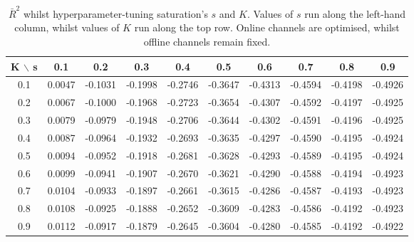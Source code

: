 \documentclass[11pt, a4paper]{article}
\begin{document}
 \begin{table}[h!]
    \centering
    \begin{tabular}{c|ccccccccc}
        \toprule
        \textbf{K $\backslash$ s} & \textbf{0.1} & \textbf{0.2} & \textbf{0.3} & \textbf{0.4} & \textbf{0.5} & \textbf{0.6} & \textbf{0.7} & \textbf{0.8} & \textbf{0.9} \\
        \midrule
        0.1 & 0.0047 & -0.1031 & -0.1998 & -0.2746 & -0.3647 & -0.4313 & -0.4594 & -0.4198 & -0.4926 \\
        0.2 & 0.0067 & -0.1000 & -0.1968 & -0.2723 & -0.3654 & -0.4307 & -0.4592 & -0.4197 & -0.4925 \\
        0.3 & 0.0079 & -0.0979 & -0.1948 & -0.2706 & -0.3644 & -0.4302 & -0.4591 & -0.4196 & -0.4925 \\
        0.4 & 0.0087 & -0.0964 & -0.1932 & -0.2693 & -0.3635 & -0.4297 & -0.4590 & -0.4195 & -0.4924 \\
        0.5 & 0.0094 & -0.0952 & -0.1918 & -0.2681 & -0.3628 & -0.4293 & -0.4589 & -0.4195 & -0.4924 \\
        0.6 & 0.0099 & -0.0941 & -0.1907 & -0.2670 & -0.3621 & -0.4290 & -0.4588 & -0.4194 & -0.4923 \\
        0.7 & 0.0104 & -0.0933 & -0.1897 & -0.2661 & -0.3615 & -0.4286 & -0.4587 & -0.4193 & -0.4923 \\
        0.8 & 0.0108 & -0.0925 & -0.1888 & -0.2652 & -0.3609 & -0.4283 & -0.4586 & -0.4192 & -0.4923 \\
        0.9 & 0.0112 & -0.0917 & -0.1879 & -0.2645 & -0.3604 & -0.4280 & -0.4585 & -0.4192 & -0.4922 \\
        \bottomrule
    \end{tabular}

    \caption{$\bar{R}^2$
 whilst hyperparameter-tuning saturation's $s$ and $K$. Values of $s$ run along the left-hand column, whilst values of $K$ run along the top row. Online channels are optimised, whilst offline channels remain fixed.}
    \label{tab:s_k_r2}
\end{table}
\end{document}
